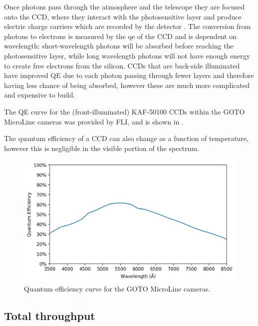\begin{colsection}
\begin{colsection}
Once photons pass through the atmosphere and the telescope they are focused onto the CCD, where they interact with the photosensitive layer and produce electric charge carriers which are recorded by the detector \citep{CCDs}. The conversion from photons to electrons is measured by the \gls{qe} of the CCD and is dependent on wavelength: short-wavelength photons will be absorbed before reaching the photosensitive layer, while long wavelength photons will not have enough energy to create free electrons from the silicon. CCDs that are back-side illuminated have improved QE due to each photon passing through fewer layers and therefore having less chance of being absorbed, however these are much more complicated and expensive to build.

The QE curve for the (front-illuminated) KAF-50100 CCDs within the GOTO MicroLine cameras was provided by FLI, and is shown in . %

The quantum efficiency of a CCD can also change as a function of temperature, however this is negligible in the visible portion of the spectrum.

\begin{figure}[t]
    \begin{center}
        \includegraphics[width=\textwidth]{images/throughput/qe.png}
    \end{center}
    \caption[MicroLine quantum efficiency curve]{
        Quantum efficiency curve for the GOTO MicroLine cameras.
    }\label{fig:qe}
\end{figure}

\end{colsection}

\newpage
\subsection{Total throughput}
\label{sec:total_throughput}
\begin{colsection}


\end{colsection}
\end{colsection}
